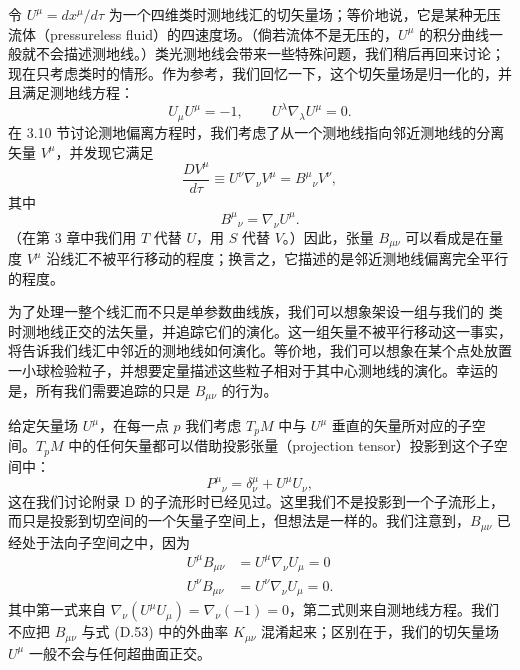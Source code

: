 令 $U^\mu = dx^\mu/d\tau$ 为一个四维类时测地线汇的切矢量场；等价地说，它是某种无压流体（pressureless fluid）的四速度场。（倘若流体不是无压的，$U^\mu$ 的积分曲线一般就不会描述测地线。）类光测地线会带来一些特殊问题，我们稍后再回来讨论；现在只考虑类时的情形。作为参考，我们回忆一下，这个切矢量场是归一化的，并且满足测地线方程：
\begin{equation*}
U_\mu U^\mu = -1,\qquad U^\lambda\nabla_\lambda U^\mu = 0.
\tag{F.1}
\end{equation*}
在 3.10 节讨论测地偏离方程时，我们考虑了从一个测地线指向邻近测地线的分离矢量 $V^\mu$，并发现它满足
\begin{equation*}
\frac{DV^\mu}{d\tau} \equiv U^\nu\nabla_\nu V^\mu = B^\mu{}_\nu V^\nu,
\tag{F.2}
\end{equation*}
其中
\begin{equation*}
B^\mu{}_\nu = \nabla_\nu U^\mu.
\tag{F.3}
\end{equation*}
（在第 3 章中我们用 $T$ 代替 $U$，用 $S$ 代替 $V$。）因此，张量 $B_{\mu\nu}$ 可以看成是在量度 $V^\mu$ 沿线汇不被平行移动的程度；换言之，它描述的是邻近测地线偏离完全平行的程度。

为了处理一整个线汇而不只是单参数曲线族，我们可以想象架设一组与我们的%
类时测地线正交的法矢量，并追踪它们的演化。这一组矢量不被平行移动这一事实，将告诉我们线汇中邻近的测地线如何演化。等价地，我们可以想象在某个点处放置一小球检验粒子，并想要定量描述这些粒子相对于其中心测地线的演化。幸运的是，所有我们需要追踪的只是 $B_{\mu\nu}$ 的行为。

给定矢量场 $U^\mu$，在每一点 $p$ 我们考虑 $T_pM$ 中与 $U^\mu$ 垂直的矢量所对应的子空间。$T_pM$ 中的任何矢量都可以借助投影张量（projection tensor）投影到这个子空间中：
\begin{equation*}
P^\mu{}_\nu = \delta^\mu_\nu + U^\mu U_\nu,
\tag{F.4}
\end{equation*}
这在我们讨论附录 D 的子流形时已经见过。这里我们不是投影到一个子流形上，而只是投影到切空间的一个矢量子空间上，但想法是一样的。我们注意到，$B_{\mu\nu}$ 已经处于法向子空间之中，因为
\begin{align*}
U^\mu B_{\mu\nu} &= U^\mu\nabla_\nu U_\mu = 0 \\
U^\nu B_{\mu\nu} &= U^\nu\nabla_\nu U_\mu = 0.
\tag{F.5}
\end{align*}
其中第一式来自 $\nabla_\nu(U^\mu U_\mu) = \nabla_\nu(-1) = 0$，第二式则来自测地线方程。我们不应把 $B_{\mu\nu}$ 与式 (D.53) 中的外曲率 $K_{\mu\nu}$ 混淆起来；区别在于，我们的切矢量场 $U^\mu$ 一般不会与任何超曲面正交。

